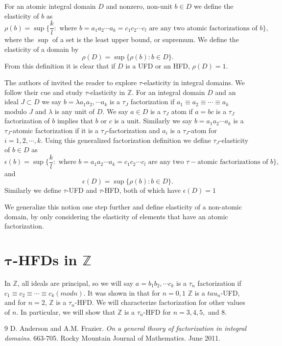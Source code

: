 \documentclass[12pt, twoside]{article}
\theoremstyle{definition}
\numberwithin{equation}{section}
\newcommand{\Z}{\mathbb{Z}}
\begin{document}
For an atomic integral domain $D$ and nonzero, non-unit $b\in D$ we define the elasticity of $b$ as $$\rho(b)=\sup\bigg\{\frac{k}{l} : \text{ where } b=a_1 a_2 \cdots a_k= c_1 c_2 \cdots c_l \text{ are any two atomic factorizations of } b\bigg\},$$ where the $\sup$ of a set is the least upper bound, or supremum.  We define the elasticity of a domain by $$\rho(D)=\sup\{\rho(b) : b\in D\}.$$  From this definition it is clear that if $D$ is a UFD or an HFD, $\rho(D)=1$.

The authors of \cite{Anderson} invited the reader to explore $\tau$-elasticity in integral domains.   We follow their cue and study $\tau$-elasticity in $\Z$.  For an integral domain $D$ and an ideal $J \subset D$ we say $b=\lambda a_1 a_2, \cdots a_k$ is a $\tau_J$ factorization if $a_1 \equiv a_2 \equiv \cdots \equiv a_k$ modulo $J$ and $\lambda$ is any unit of $D$.  We say $a\in D$ is a $\tau_J$ atom if $a=bc$ is a $\tau_J$ factorization of $b$ implies that $b$ or $c$ is a unit.   Similarly we say $b=a_1 a_2\cdots a_k$ is a $\tau_J$-atomic factorization if it is a $\tau_J$-factorization and $a_i$ is a $\tau_J$-atom for $i=1, 2, \cdots, k$.  Using this generalized factorization definition we define $\tau_J$-elasticity of $b\in D$ as $$\epsilon(b)=\sup\bigg\{\frac{k}{l} : \text{ where } b=a_1 a_2 \cdots a_k= c_1 c_2 \cdots c_l \text{ are any two } \tau-\text{atomic factorizations of } b\bigg\},$$ and $$\epsilon(D)=\sup\{\rho(b) : b\in D\}.$$  Similarly we define $\tau$-UFD and $\tau$-HFD, both of which have $\epsilon(D)=1$

We generalize this notion one step further and define elasticity of a non-atomic domain, by only considering the elasticity of elements that have an atomic factorization.


\section{$\bm{\tau}$-HFDs in $\Z$}

In $\Z$, all ideals are principal, so we will say $a=b_1 b_2, \cdots c_k$ is a $\tau_n$ factorization if $c_1\equiv c_2\equiv \cdots \equiv c_k (mod n)$.  It was shown in \cite{Anderson} that for $n=0, 1$ $\Z$ is a $tau_n$-UFD, and for $n=2$, $\Z$ is a $\tau_n$-HFD.  We will characterize factorization for other values of $n$.  In particular, we will show that $\Z$ is a $\tau_n$-HFD for $n=3, 4, 5,$ and $8$.

\medskip

\begin {thebibliography}{9}
D. Anderson and A.M. Frazier.
\textit{On a general theory of factorization in integral domains}. 663-705.
Rocky Mountain Journal of Mathematics. June 2011.

\end{thebibliography}
\end{document}
